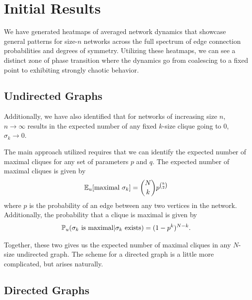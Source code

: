 
\section{Initial Results}
\label{sec:Initial Results}

We have generated heatmaps of averaged network dynamics that showcase general patterns for size-$n$ networks across the full spectrum of edge connection probabilities and degrees of symmetry. Utilizing these heatmaps, we can see a distinct zone of phase transition where the dynamics go from coalescing to a fixed point to exhibiting strongly chaotic behavior.


\subsection{Undirected Graphs}%
\label{sub:Undirected Graphs}

Additionally, we have also identified that for networks of increasing size $n$, $n\to\infty$ results in the expected number of any fixed $k$-size clique going to 0, $\sigma_k \to 0$.

The main approach utilized requires that we can identify the expected number of maximal cliques for any set of parameters $p$ and $q$. The expected number of maximal cliques is given by
\begin{align}
    \label{eq:e of max}
    \mathbb{E}_u[\mbox{maximal } \sigma_k] = \binom{N}{k}p^{\binom{k}{2}}
\end{align}
where $p$ is the probability of an edge between any two vertices in the network.
Additionally, the probability that a clique is maximal is given by
\begin{align}
    \label{eq:p max undirected}
    \mathbb{P}_u{(\sigma_k \mbox{ is maximal}|\sigma_k \mbox{ exists})} = (1-p^k)^{N-k}.
\end{align}

Together, these two gives us the expected number of maximal cliques in any $N$-size undirected graph. The scheme for a directed graph is a little more complicated, but arises naturally.

\subsection{Directed Graphs}%
\label{sub:Directed Graphs}

